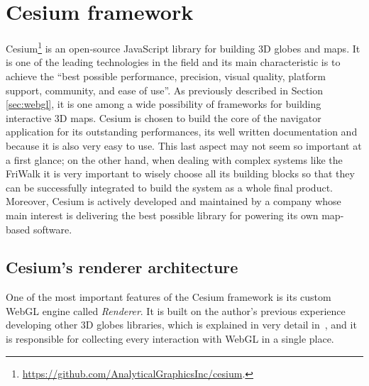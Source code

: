 \section{Cesium framework} \label{sec:cesium}
Cesium\footnote{\url{https://github.com/AnalyticalGraphicsInc/cesium}.} is an
open-source JavaScript library for building 3D globes and maps.
It is one of the leading technologies in the
field and its main characteristic is to achieve the ``best possible performance,
precision, visual quality, platform support, community, and ease of use''.
As previously described in Section \ref{sec:webgl}, it is one among a wide
possibility of frameworks for building interactive 3D maps. Cesium is chosen to
build the core of the navigator application for its outstanding performances,
its well written documentation and because it is also very easy to use. This last aspect
may not seem so important at a first glance; on the other hand, when dealing with
complex systems like the FriWalk it is very important to wisely choose all its building
blocks so that they can be successfully integrated to build the system as a whole
final product. Moreover, Cesium is actively developed and maintained by a company
whose main interest is delivering the best possible library for powering its
own map-based software.

\subsection{Cesium's renderer architecture}
One of the most important features of the Cesium framework is its custom WebGL engine
called \emph{Renderer}.
It is built on the author's previous experience developing
other 3D globes libraries, which is explained in very detail in~\cite{cozzi20113d},
and it is responsible for collecting every interaction with WebGL in a single place.

